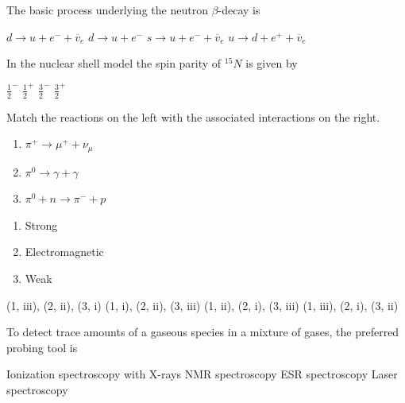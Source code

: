 \documentclass{exam}
\begin{document}
\begin{questions}
\question The basic process underlying the neutron $\beta$-decay is\hfill{}

\begin{oneparchoices}
	\choice $d \rightarrow u + e^{-} + \overline{v}_{e}$
	\choice $d \rightarrow u + e^{-}$
	\choice $s \rightarrow u + e^{-} + \overline{v}_{e}$
	\choice $u \rightarrow d + e^{+} + \overline{v}_{e}$
\end{oneparchoices}

\question In the nuclear shell model the spin parity of ${}^{15}N$ is given by\hfill{}

\begin{oneparchoices}
	\choice $\frac{1}{2}^{-}$ \choice $\frac{1}{2}^{+}$ \choice $\frac{3}{2}^{-}$ \choice $\frac{3}{2}^{+}$
\end{oneparchoices}

\question Match the reactions on the left with the associated interactions on the right.\hfill{}

\begin{multicols}{2}
\begin{enumerate}[label=(\arabic*)]
		\item $\pi^{+} \rightarrow \mu^{+} + \nu_{\mu}$
		\item $\pi^{0} \rightarrow \gamma + \gamma$
		\item $\pi^{0} + n \rightarrow \pi^{-} + p$
	\end{enumerate}
\columnbreak
\begin{enumerate}[label=(\roman*)]
		\item Strong
		\item Electromagnetic
		\item Weak
	\end{enumerate}
\end{multicols}

\begin{oneparchoices}
	\choice (1, iii), (2, ii), (3, i) \choice (1, i), (2, ii), (3, iii)
	\choice (1, ii), (2, i), (3, iii) \choice (1, iii), (2, i), (3, ii)
\end{oneparchoices}

\question To detect trace amounts of a gaseous species in a mixture of gases, the preferred probing tool is\hfill{}

\begin{choices}
	\begin{multicols}{2}
\choice Ionization spectroscopy with X-rays \choice NMR spectroscopy
	\choice ESR spectroscopy \choice Laser spectroscopy
	\end{multicols}
\end{choices}


\end{questions}
\end{document}
